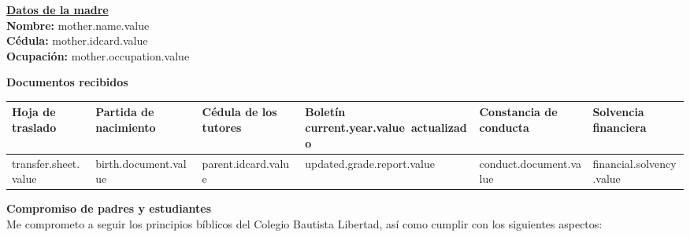 \documentclass[12pt]{article}
\newcommand{\aField}[1]{#1}
\newcommand{\motherName}{mother.name.value}
\newcommand{\motherIdcard}{mother.idcard.value}
\newcommand{\motherOccupation}{mother.occupation.value}
\newcommand{\transferSheet}{transfer.sheet.value}
\newcommand{\currentYear}{current.year.value}
\newcommand{\birthDocument}{birth.document.value}
\newcommand{\parentIdcard}{parent.idcard.value}
\newcommand{\updatedGradeReport}{updated.grade.report.value}
\newcommand{\conductDocument}{conduct.document.value}
\newcommand{\financialSolvency}{financial.solvency.value}
\begin{document}
    \begin{minipage}[t]{0.49\textwidth}
        \textbf{\uline{Datos de la madre}}\\[1mm]
        \textbf{Nombre:} \aField{\motherName}\\
        \textbf{Cédula:} \aField{\motherIdcard}\\
        \textbf{Ocupación:} \aField{\motherOccupation}
    \end{minipage}
    \par\vspace{7mm}
    \textbf{Documentos recibidos}
    \begin{table}[H]
        \centering
        \begin{tabular}{|p{1.8cm}|p{2.3cm}|p{2.2cm}|p{2.5cm}|p{2.5cm}|p{2cm}|}
            \hline
            Hoja de traslado &
            Partida de nacimiento &
            Cédula de los tutores &
            Boletín \currentYear\ actualizado &
            Constancia de conducta &
            Solvencia financiera\\
            \hline
            \hspace{6mm}\transferSheet &
            \hspace{9mm}\birthDocument &
            \hspace{9mm}\parentIdcard &
            \hspace{10mm}\updatedGradeReport &
            \hspace{10mm}\conductDocument &
            \hspace{7mm}\financialSolvency\\
            \hline
        \end{tabular}
    \end{table}
    \textbf{Compromiso de padres y estudiantes}\\
    Me comprometo a seguir los principios bíblicos del Colegio Bautista Libertad, así como cumplir con los siguientes aspectos:
\end{document}
